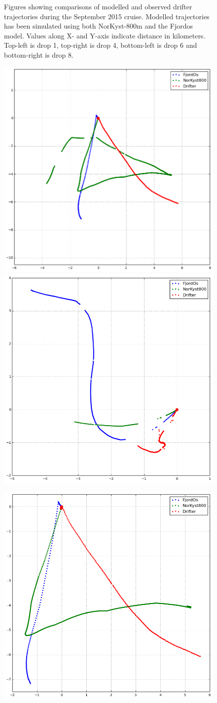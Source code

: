 \begin{figure}[ht]
{}
\caption{\small
Figures showing comparisons of modelled and observed drifter trajectories during the September 2015 cruise. Modelled trajectories has been simulated using both NorKyst-800m and the Fjordos model. Values along X- and Y-axis indicate distance in kilometers. Top-left is drop 1, top-right is drop 4, bottom-left is drop 6 and bottom-right is drop 8.}
\label{fig:opendrift_trajectories1}
\end{figure}

\begin{figure}[ht]
\centerline{
\includegraphics*[width=.5\textwidth]{Figurer/opendrift/skillscore/drop51i4}
\includegraphics*[width=.5\textwidth]{Figurer/opendrift/skillscore/drop52i8}
}
\centerline{
\includegraphics*[width=.5\textwidth]{Figurer/opendrift/skillscore/drop61i5}
}
\end{figure}
